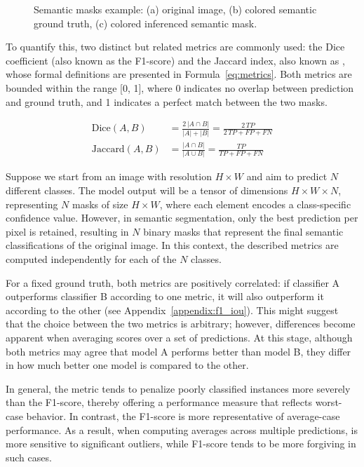 \begin{figure}[htbp]
    \caption{Semantic masks example: (a) original image, (b) colored semantic ground truth, (c) colored inferenced semantic mask.}
    \label{fig:semantic_masks}
\end{figure}

To quantify this, two distinct but related metrics are commonly used: the Dice coefficient (also known as the F1-score) and the Jaccard index, also known as , whose formal definitions are presented in Formula~\ref{eq:metrics}. Both metrics are bounded within the range [0, 1], where 0 indicates no overlap between prediction and ground truth, and 1 indicates a perfect match between the two masks.

\begin{equation}
    \begin{aligned}
    \text{Dice}(A, B) &= \frac{2\,|A \cap B|}{|A| + |B|} = \frac{2\,TP}{2\,TP + FP + FN} \\
    \text{Jaccard}(A, B)  &= \frac{|A \cap B|}{|A \cup B|} = \frac{TP}{TP + FP + FN}
    \end{aligned}
    \label{eq:metrics}
\end{equation}

Suppose we start from an image with resolution $H \times W$ and aim to predict $N$ different classes. The model output will be a tensor of dimensions $H \times W \times N$, representing $N$ masks of size $H \times W$, where each element encodes a class-specific confidence value. However, in semantic segmentation, only the best prediction per pixel is retained, resulting in $N$ binary masks that represent the final semantic classifications of the original image. In this context, the described metrics are computed independently for each of the $N$ classes.

For a fixed ground truth, both metrics are positively correlated: if classifier A outperforms classifier B according to one metric, it will also outperform it according to the other (see Appendix~\ref{appendix:f1_iou}). This might suggest that the choice between the two metrics is arbitrary; however, differences become apparent when averaging scores over a set of predictions. At this stage, although both metrics may agree that model A performs better than model B, they differ in how much better one model is compared to the other.

In general, the  metric tends to penalize poorly classified instances more severely than the F1-score, thereby offering a performance measure that reflects worst-case behavior. In contrast, the F1-score is more representative of average-case performance. As a result, when computing averages across multiple predictions,  is more sensitive to significant outliers, while F1-score tends to be more forgiving in such cases.

